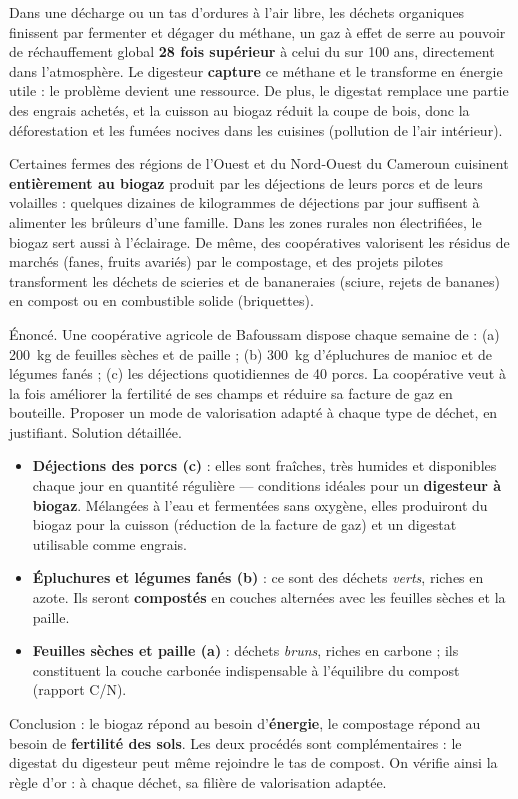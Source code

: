 \documentclass[11pt]{article}
\begin{document}
Dans une décharge ou un tas d'ordures à l'air libre, les déchets organiques finissent par fermenter et dégager du méthane, un gaz à effet de serre au pouvoir de réchauffement global \textbf{28 fois supérieur} à celui du  sur 100 ans, directement dans l'atmosphère. Le digesteur \textbf{capture} ce méthane et le transforme en énergie utile : le problème devient une ressource. De plus, le digestat remplace une partie des engrais achetés, et la cuisson au biogaz réduit la coupe de bois, donc la déforestation et les fumées nocives dans les cuisines (pollution de l'air intérieur).

\begin{savaistu}
Certaines fermes des régions de l'Ouest et du Nord-Ouest du Cameroun cuisinent \textbf{entièrement au biogaz} produit par les déjections de leurs porcs et de leurs volailles : quelques dizaines de kilogrammes de déjections par jour suffisent à alimenter les brûleurs d'une famille. Dans les zones rurales non électrifiées, le biogaz sert aussi à l'éclairage. De même, des coopératives valorisent les résidus de marchés (fanes, fruits avariés) par le compostage, et des projets pilotes transforment les déchets de scieries et de bananeraies (sciure, rejets de bananes) en compost ou en combustible solide (briquettes).
\end{savaistu}

\begin{exoresolu}
Énoncé. Une coopérative agricole de Bafoussam dispose chaque semaine de : (a) \SI{200}{kg} de feuilles sèches et de paille ; (b) \SI{300}{kg} d'épluchures de manioc et de légumes fanés ; (c) les déjections quotidiennes de 40 porcs. La coopérative veut à la fois améliorer la fertilité de ses champs et réduire sa facture de gaz en bouteille. Proposer un mode de valorisation adapté à chaque type de déchet, en justifiant.
\tcblower
Solution détaillée.
\begin{itemize}
\item \textbf{Déjections des porcs (c)} : elles sont fraîches, très humides et disponibles chaque jour en quantité régulière — conditions idéales pour un \textbf{digesteur à biogaz}. Mélangées à l'eau et fermentées sans oxygène, elles produiront du biogaz pour la cuisson (réduction de la facture de gaz) et un digestat utilisable comme engrais.
\item \textbf{Épluchures et légumes fanés (b)} : ce sont des déchets \emph{verts}, riches en azote. Ils seront \textbf{compostés} en couches alternées avec les feuilles sèches et la paille.
\item \textbf{Feuilles sèches et paille (a)} : déchets \emph{bruns}, riches en carbone ; ils constituent la couche carbonée indispensable à l'équilibre du compost (rapport C/N).
\end{itemize}
Conclusion : le biogaz répond au besoin d'\textbf{énergie}, le compostage répond au besoin de \textbf{fertilité des sols}. Les deux procédés sont complémentaires : le digestat du digesteur peut même rejoindre le tas de compost. On vérifie ainsi la règle d'or : à chaque déchet, sa filière de valorisation adaptée.
\end{exoresolu}
\end{document}
